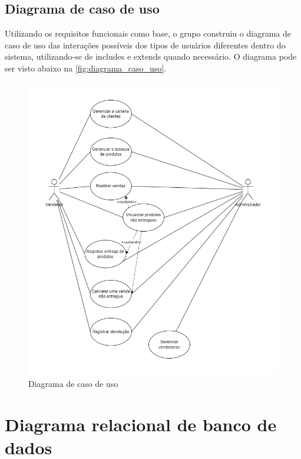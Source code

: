 \documentclass[serif, english, brazilian, oneside]{uffstex}
\begin{document}
\newpage

\subsection{Diagrama de caso de uso}

Utilizando os requisitos funcionais como base, o grupo construiu o diagrama de caso de uso das interações possíveis dos tipos de usuários diferentes dentro do sistema, utilizando-se de includes e extends quando necessário. O diagrama pode ser visto abaixo na \autoref{fig:diagrama_caso_uso}.

\begin{figure}[!htpb]
    \centering
    \caption{Diagrama de caso de uso}
    \label{fig:diagrama_caso_uso}
    \includegraphics[width=\linewidth]{imagens/diagrama_caso_uso.png}
\end{figure}

\newpage

\section{Diagrama relacional de banco de dados}
\end{document}
